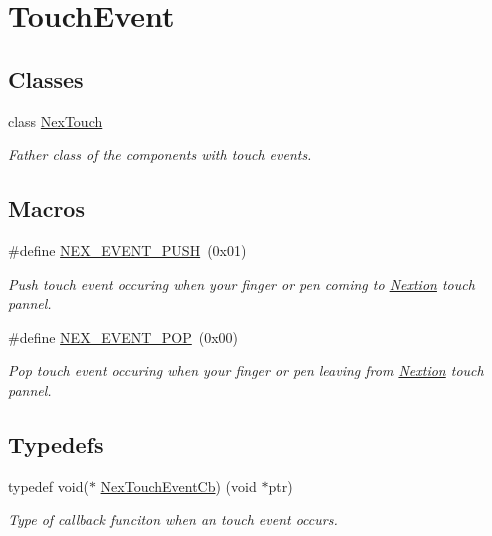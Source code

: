 \hypertarget{group___touch_event}{}\section{Touch\+Event}
\label{group___touch_event}
\subsection*{Classes}
\begin{DoxyCompactItemize}
\item 
class \hyperlink{class_nex_touch}{Nex\+Touch}
\begin{DoxyCompactList}\small\item\em Father class of the components with touch events. \end{DoxyCompactList}\end{DoxyCompactItemize}
\subsection*{Macros}
\begin{DoxyCompactItemize}
\item 
\hypertarget{group___touch_event_ga748c37a9bbe04ddc680fe1686154fefb}{}\#define \hyperlink{group___touch_event_ga748c37a9bbe04ddc680fe1686154fefb}{N\+E\+X\+\_\+\+E\+V\+E\+N\+T\+\_\+\+P\+U\+S\+H}~(0x01)\label{group___touch_event_ga748c37a9bbe04ddc680fe1686154fefb}

\begin{DoxyCompactList}\small\item\em Push touch event occuring when your finger or pen coming to \hyperlink{class_nextion}{Nextion} touch pannel. \end{DoxyCompactList}\item 
\hypertarget{group___touch_event_ga5db3d99f88ac878875ca47713b7a54b6}{}\#define \hyperlink{group___touch_event_ga5db3d99f88ac878875ca47713b7a54b6}{N\+E\+X\+\_\+\+E\+V\+E\+N\+T\+\_\+\+P\+O\+P}~(0x00)\label{group___touch_event_ga5db3d99f88ac878875ca47713b7a54b6}

\begin{DoxyCompactList}\small\item\em Pop touch event occuring when your finger or pen leaving from \hyperlink{class_nextion}{Nextion} touch pannel. \end{DoxyCompactList}\end{DoxyCompactItemize}
\subsection*{Typedefs}
\begin{DoxyCompactItemize}
\item 
typedef void($\ast$ \hyperlink{group___touch_event_ga95f5c2ce3d34b0b7e7d2cac3076a768e}{Nex\+Touch\+Event\+Cb}) (void $\ast$ptr)
\begin{DoxyCompactList}\small\item\em Type of callback funciton when an touch event occurs. \end{DoxyCompactList}\end{DoxyCompactItemize}


